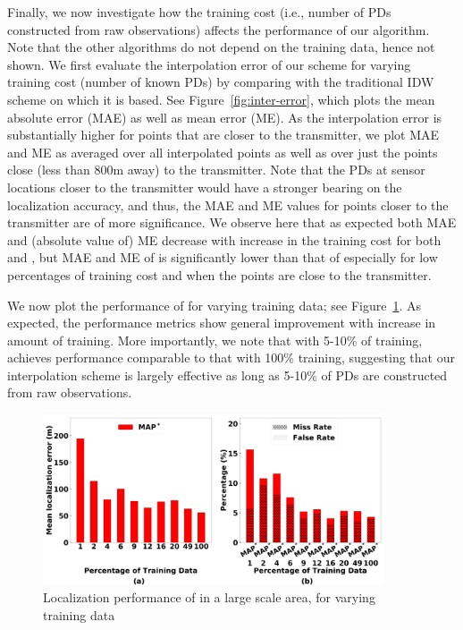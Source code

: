   Finally, we now investigate how the
training cost (i.e., number of PDs constructed from raw observations)
affects the performance of our \ouralgo algorithm. Note that the other
algorithms do not depend on the training data, hence not shown.
We first evaluate the interpolation error of our \ildw scheme for
varying training cost (number of known PDs) by comparing with the
traditional IDW scheme on which it is based. See
Figure~\ref{fig:inter-error}, which plots the mean absolute error
(MAE) as well as mean error (ME). As the interpolation error is
substantially higher for points that are closer to the transmitter, we
plot MAE and ME as averaged over all interpolated points as well as
over just the points close (less than 800m away) to the transmitter. Note
that the PDs at sensor locations closer to the transmitter would have
a stronger bearing on the localization accuracy, and thus, the MAE and
ME values for points closer to the transmitter are of more
significance.
We observe here that as expected both MAE and (absolute value of) ME
decrease with increase in the training cost for both \idw and \ildw,
but MAE and ME of \ildw is significantly lower than that of \idw
especially for low percentages of training cost and when the points
are close to the transmitter.

We now plot the performance of \ouralgo for varying training data; see
Figure~\ref{fig:varying-training-data}. As expected, the performance
metrics show general improvement with increase in amount of
training. More importantly, we note that with 5-10\% of training,
\ouralgo achieves performance comparable to that with 100\% training,
suggesting that our interpolation scheme is largely effective as long
as 5-10\% of PDs are constructed from raw observations. 



\begin{figure}[ht]
	\centering
	\includegraphics[width=0.9\textwidth]{chapters/ipsn/figures/splat-vary-training.png}
	\caption{Localization performance of \ouralgo in a large scale area, for varying training data}
	\label{fig:varying-training-data}
\end{figure}

